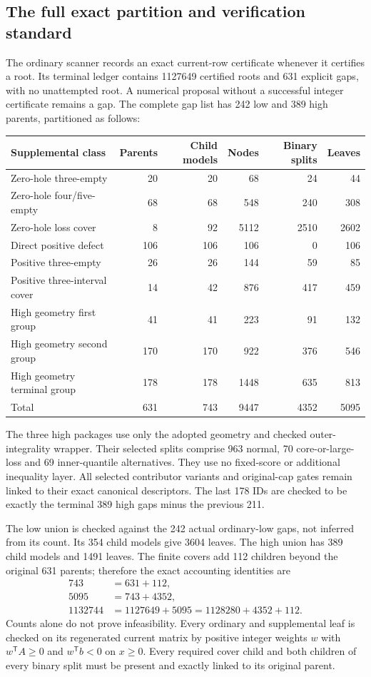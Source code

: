 \documentclass[11pt,a4paper]{article}
\theoremstyle{remark}
\begin{document}
\subsection{The full exact partition and verification standard}
The ordinary scanner records an exact current-row certificate whenever
it certifies a root. Its terminal ledger contains 1127649 certified
roots and 631 explicit gaps, with no unattempted root. A numerical
proposal without a successful integer certificate remains a gap.
The complete gap list has 242 low and 389 high parents, partitioned as
follows:
\begin{center}\small
\begin{tabular}{lrrrrr}
\toprule
Supplemental class&Parents&Child models&Nodes&Binary splits&Leaves\\\midrule
Zero-hole three-empty&20&20&68&24&44\\
Zero-hole four/five-empty&68&68&548&240&308\\
Zero-hole loss cover&8&92&5112&2510&2602\\
Direct positive defect&106&106&106&0&106\\
Positive three-empty&26&26&144&59&85\\
Positive three-interval cover&14&42&876&417&459\\
High geometry first group&41&41&223&91&132\\
High geometry second group&170&170&922&376&546\\
High geometry terminal group&178&178&1448&635&813\\\midrule
Total&631&743&9447&4352&5095\\\bottomrule
\end{tabular}
\end{center}
The three high packages use only the adopted geometry and checked
outer-integrality wrapper. Their selected splits comprise 963 normal,
70 core-or-large-loss and 69 inner-quantile alternatives.
They use no fixed-score or additional inequality layer.
All selected contributor variants and original-cap gates remain linked
to their exact canonical descriptors. The last 178 IDs are checked to
be exactly the terminal 389 high gaps minus the previous 211.

The low union is checked against the 242 actual ordinary-low gaps,
not inferred from its count. Its 354 child models give 3604 leaves.
The high union has 389 child models and 1491 leaves.
The finite covers add 112 children beyond the original 631 parents;
therefore the exact accounting identities are
\begin{align*}
 743&=631+112,\\
 5095&=743+4352,\\
 1132744&=1127649+5095=1128280+4352+112.
\end{align*}
Counts alone do not prove infeasibility. Every ordinary and supplemental
leaf is checked on its regenerated current matrix by positive integer
weights $w$ with $w^{\mathsf T}A\ge0$ and $w^{\mathsf T}b<0$ on
$x\ge0$. Every required cover child and both children of every binary
split must be present and exactly linked to its original parent.
\end{document}
